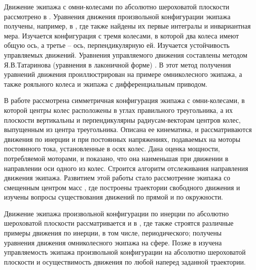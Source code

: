 Движение экипажа с омни-колесами по абсолютно шероховатой плоскости рассмотрено в \cite{ZobovaTatarinovAspecty2006,zobova2008svobodnye8020851,ZobovaTatarinovPMM,Zobova2011}. Уравнения движения произвольной конфигурации экипажа получены, например, в \cite{ZobovaTatarinovPMM}, где также найдены их первые интегралы и инвариантная мера. Изучается конфигурация с тремя колесами, в которой два колеса имеют общую ось, а третье -- ось, перпендикулярную ей. Изучается устойчивость управляемых движений. Уравнения управляемого движения составлены методом Я.В.Татаринова (уравнения в лаконичной форме) \cite{Tatarinov,Tatarinov2005}. В \cite{Zobova2011} этот метод получения уравнений движения  проиллюстрирован на примере омниколесного экипажа, а также рояльного колеса и экипажа с дифференциальным приводом.

В работе \cite{formalskii} рассмотрена симметричная конфигурация экипажа с омни-колесами, в которой центры колес расположены в углах правильного треугольника, а их плоскости вертикальны и перпендикулярны радиусам-векторам центров колес, выпущенным из центра треугольника. Описана ее кинематика, и рассматриваются движения по инерции и при постоянных напряжениях, подаваемых на моторы постоянного тока, установленные в осях колес. Дана оценка мощности, потребляемой моторами, и показано, что она наименьшая при движении в направлении оси одного из колес. Строится алгоритм отслеживания направления движения экипажа. Развитием этой работы стало рассмотрение экипажа со смещенным центром масс \cite{Martynenko2010_rus}, где построены траектории свободного движения и изучены вопросы существования движений по прямой и по окружности.

Движение экипажа произвольной конфигурации по инерции по абсолютно шероховатой плоскости рассматривается и в \cite{Borisov2011}, где также строятся различные примеры движения по инерции, в том числе, периодического; получены уравнения движения омниколесного экипажа на сфере. Позже в \cite{KilinBobykin2014} изучена управляемость экипажа произвольной конфигурации на абсолютно шероховатой плоскости и осуществимость движения по любой наперед заданной траектории.

